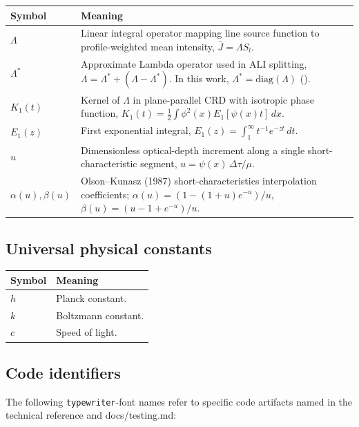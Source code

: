\documentclass[11pt]{article}
\newcommand{\Lop}{\Lambda}
\newcommand{\Lstar}{\Lambda^{*}}
\newcommand{\Jbar}{\bar{J}}
\newcommand{\Sl}{S_{l}}
\newcommand{\code}[1]{\texttt{#1}}
\begin{document}
\noindent\begin{tabular}{@{}p{1.4in}p{4.8in}@{}}
\toprule
\textbf{Symbol} & \textbf{Meaning} \\ \midrule
$\Lop$ & Linear integral operator mapping line source function to profile-weighted mean intensity, $\Jbar = \Lop \Sl$. \\
$\Lstar$ & Approximate Lambda operator used in ALI splitting, $\Lop = \Lstar + (\Lop - \Lstar)$.  In this work, $\Lstar = \mathrm{diag}(\Lop)$ (\citealt{OlsonAuerBuchler1986}). \\
$K_1(t)$ & Kernel of $\Lop$ in plane-parallel CRD with isotropic phase function, $K_1(t) = \tfrac{1}{2}\int \phi^2(x) E_1[\psi(x) t]\, dx$. \\
$E_1(z)$ & First exponential integral, $E_1(z) = \int_1^\infty t^{-1} e^{-z t}\, dt$. \\
$u$ & Dimensionless optical-depth increment along a single short-characteristic segment, $u = \psi(x)\,\Delta\tau / \mu$. \\
$\alpha(u), \beta(u)$ & Olson--Kunasz (1987) short-characteristics interpolation coefficients; $\alpha(u) = (1 - (1+u)e^{-u})/u$, $\beta(u) = (u - 1 + e^{-u})/u$. \\
\bottomrule
\end{tabular}

\subsection*{Universal physical constants}

\noindent\begin{tabular}{@{}p{1.4in}p{4.8in}@{}}
\toprule
\textbf{Symbol} & \textbf{Meaning} \\ \midrule
$h$ & Planck constant. \\
$k$ & Boltzmann constant. \\
$c$ & Speed of light. \\
\bottomrule
\end{tabular}

\subsection*{Code identifiers}

The following \code{typewriter}-font names refer to specific code
artifacts named in the technical reference and docs/testing.md:
\end{document}
